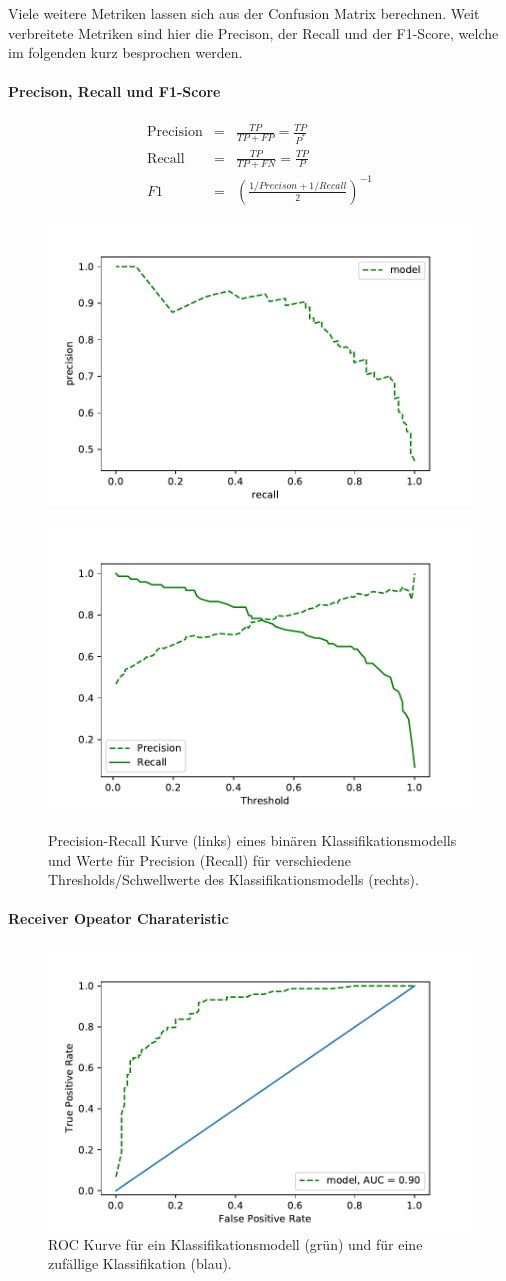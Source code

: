 \documentclass[twoside=true, openright, pdftex, bibliography=totoc, chapterprefix=true, appendixprefix=true, numbers=noenddot, parskip=half, titlepage, index=totoc, headlines=3, footlines=2, headings=normal, language=german]{scrartcl}
\begin{document}
Viele weitere Metriken lassen sich aus der Confusion Matrix berechnen. Weit verbreitete Metriken sind hier die Precison, der Recall und der F1-Score, welche im folgenden kurz besprochen werden.

\paragraph{Precison, Recall und F1-Score}

\begin{eqnarray}
  \mathrm{Precision} &=& \frac{TP}{TP + FP} = \frac{TP}{P^*} \\
  \mathrm{Recall} &=& \frac{TP}{TP + FN} = \frac{TP}{P}\\
  F1 &=& \left(\frac{1/Precison + 1/Recall}{2}\right)^{-1}
\end{eqnarray}


\begin{figure}[t!]
  \centering
        \includegraphics[width=.45\textwidth]{precRecall.pdf}\
        \includegraphics[width=.45\textwidth]{precRecallVsThreshold.pdf}
    \caption{Precision-Recall Kurve (links) eines binären Klassifikationsmodells und Werte für Precision (Recall) für verschiedene Thresholds/Schwellwerte des Klassifikationsmodells (rechts). \label{preRec}}
\end{figure}

\paragraph{Receiver Opeator Charateristic}

\begin{figure}[t!]
  \centering
        \includegraphics[width=.45\textwidth]{roc.pdf}
    \caption{ROC Kurve für ein Klassifikationsmodell (grün) und für eine zufällige Klassifikation (blau). \label{roc}}
\end{figure}
\end{document}
